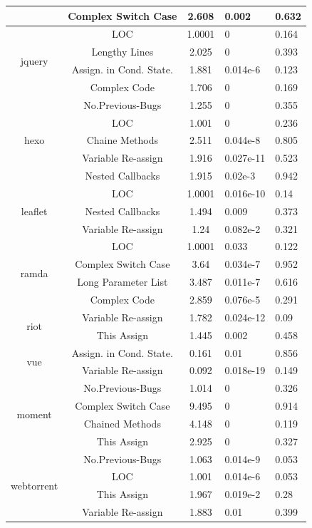 \begin{table}[!htbp]
\begin{tabular}{c|c|c|p{2cm}|p{2cm}}
 & Complex Switch Case & 2.608 & 0.002 & 0.632 \\ \hline
\multirow{4}{*}{jquery}
 & LOC & 1.0001 & 0 & 0.164 \\ \cline{2-5}
 & Lengthy Lines & 2.025 & 0 & 0.393 \\ \cline{2-5}
 & Assign. in Cond. State. & 1.881 & 0.014e-6 & 0.123 \\ \cline{2-5}
 & Complex Code & 1.706 & 0 & 0.169 \\ \hline
\multirow{5}{*}{hexo}
 & No.Previous-Bugs & 1.255 & 0 & 0.355 \\ \cline{2-5}
 & LOC & 1.001 & 0 & 0.236 \\ \cline{2-5}
 & Chaine Methods & 2.511 & 0.044e-8 & 0.805 \\ \cline{2-5}
 & Variable Re-assign & 1.916 & 0.027e-11 & 0.523 \\ \cline{2-5}
 & Nested Callbacks & 1.915 & 0.02e-3 & 0.942 \\ \hline
\multirow{3}{*}{leaflet}
 & LOC & 1.0001 & 0.016e-10 & 0.14 \\ \cline{2-5}
 & Nested Callbacks & 1.494 & 0.009 & 0.373 \\ \cline{2-5}
 & Variable Re-assign & 1.24 & 0.082e-2 & 0.321 \\ \hline
\multirow{4}{*}{ramda}
 & LOC & 1.0001 & 0.033 & 0.122 \\ \cline{2-5}
 & Complex Switch Case & 3.64 & 0.034e-7 & 0.952 \\ \cline{2-5}
 & Long Parameter List & 3.487 & 0.011e-7 & 0.616 \\ \cline{2-5}
 & Complex Code & 2.859 & 0.076e-5 & 0.291 \\ \hline
\multirow{2}{*}{riot}
 & Variable Re-assign & 1.782 & 0.024e-12 & 0.09 \\ \cline{2-5}
 & This Assign & 1.445 & 0.002 & 0.458 \\ \hline
\multirow{2}{*}{vue}
 & Assign. in Cond. State. & 0.161 & 0.01 & 0.856 \\ \cline{2-5}
 & Variable Re-assign & 0.092 & 0.018e-19 & 0.149 \\ \hline
\multirow{4}{*}{moment}
 & No.Previous-Bugs & 1.014 & 0 & 0.326 \\ \cline{2-5}
 & Complex Switch Case & 9.495 & 0 & 0.914 \\ \cline{2-5}
 & Chained Methods & 4.148 & 0 & 0.119 \\ \cline{2-5}
 & This Assign & 2.925 & 0 & 0.327 \\ \hline
\multirow{4}{*}{webtorrent}
 & No.Previous-Bugs & 1.063 & 0.014e-9 & 0.053 \\ \cline{2-5}
 & LOC & 1.001 & 0.014e-6 & 0.053 \\ \cline{2-5}
 & This Assign & 1.967 & 0.019e-2 & 0.28 \\ \cline{2-5}
 & Variable Re-assign & 1.883 & 0.01 & 0.399 \\ \hline
\end{tabular}
\label{smelltypes}
\vspace{-15pt}
\end{table}

